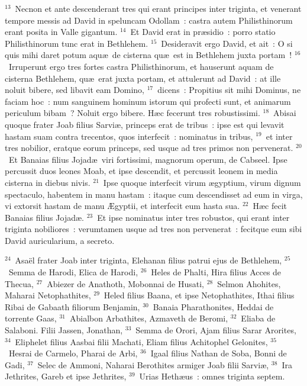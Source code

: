 ${}^{13}$~Necnon et ante descenderant tres qui erant principes inter triginta, et venerant tempore messis ad David in speluncam Odollam~: castra autem Philisthinorum erant posita in Valle gigantum.
${}^{14}$~Et David erat in pr\ae sidio~: porro statio Philisthinorum tunc erat in Bethlehem.
${}^{15}$~Desideravit ergo David, et ait~: O si quis mihi daret potum aqu\ae\ de cisterna qu\ae\ est in Bethlehem juxta portam~!
${}^{16}$~Irruperunt ergo tres fortes castra Philisthinorum, et hauserunt aquam de cisterna Bethlehem, qu\ae\ erat juxta portam, et attulerunt ad David~: at ille noluit bibere, sed libavit eam Domino,
${}^{17}$~dicens~: Propitius sit mihi Dominus, ne faciam hoc~: num sanguinem hominum istorum qui profecti sunt, et animarum periculum bibam~? Noluit ergo bibere. H\ae c fecerunt tres robustissimi.
${}^{18}$~Abisai quoque frater Joab filius Sarvi\ae , princeps erat de tribus~: ipse est qui levavit hastam suam contra trecentos, quos interfecit~: nominatus in tribus,
${}^{19}$~et inter tres nobilior, eratque eorum princeps, sed usque ad tres primos non pervenerat.
${}^{20}$~Et Banaias filius Jojad\ae\ viri fortissimi, magnorum operum, de Cabseel. Ipse percussit duos leones Moab, et ipse descendit, et percussit leonem in media cisterna in diebus nivis.
${}^{21}$~Ipse quoque interfecit virum \ae gyptium, virum dignum spectaculo, habentem in manu hastam~: itaque cum descendisset ad eum in virga, vi extorsit hastam de manu \AE gyptii, et interfecit eum hasta sua.
${}^{22}$~H\ae c fecit Banaias filius Jojad\ae .
${}^{23}$~Et ipse nominatus inter tres robustos, qui erant inter triginta nobiliores~: verumtamen usque ad tres non pervenerat~: fecitque eum sibi David auricularium, a secreto.


${}^{24}$~Asa\"el frater Joab inter triginta, Elehanan filius patrui ejus de Bethlehem,
${}^{25}$~Semma de Harodi, Elica de Harodi,
${}^{26}$~Heles de Phalti, Hira filius Acces de Thecua,
${}^{27}$~Abiezer de Anathoth, Mobonnai de Husati,
${}^{28}$~Selmon Ahohites, Maharai Netophathites,
${}^{29}$~Heled filius Baana, et ipse Netophathites, Ithai filius Ribai de Gabaath filiorum Benjamin,
${}^{30}$~Banaia Pharathonites, Heddai de torrente Gaas,
${}^{31}$~Abialbon Arbathites, Azmaveth de Beromi,
${}^{32}$~Eliaba de Salaboni. Filii Jassen, Jonathan,
${}^{33}$~Semma de Orori, Ajam filius Sarar Arorites,
${}^{34}$~Eliphelet filius Aasbai filii Machati, Eliam filius Achitophel Gelonites,
${}^{35}$~Hesrai de Carmelo, Pharai de Arbi,
${}^{36}$~Igaal filius Nathan de Soba, Bonni de Gadi,
${}^{37}$~Selec de Ammoni, Naharai Berothites armiger Joab filii Sarvi\ae ,
${}^{38}$~Ira Jethrites, Gareb et ipse Jethrites,
${}^{39}$~Urias Heth\ae us~: omnes triginta septem.

